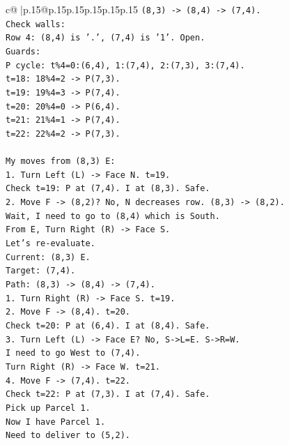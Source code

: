 \documentclass{article}
\begin{document}
{\begin{supertabular}{c@{$\;$}|p{.15\linewidth}@{}p{.15\linewidth}p{.15\linewidth}p{.15\linewidth}p{.15\linewidth}p{.15\linewidth}}
{{{\texttt{(8,3) {-}> (8,4) {-}> (7,4).} \\
\texttt{Check walls:} \\
\texttt{Row 4: (8,4) is '.', (7,4) is '1'. Open.} \\
\texttt{Guards:} \\
\texttt{P cycle: t\%4=0:(6,4), 1:(7,4), 2:(7,3), 3:(7,4).} \\
\texttt{t=18: 18\%4=2 {-}> P(7,3).} \\
\texttt{t=19: 19\%4=3 {-}> P(7,4).} \\
\texttt{t=20: 20\%4=0 {-}> P(6,4).} \\
\texttt{t=21: 21\%4=1 {-}> P(7,4).} \\
\texttt{t=22: 22\%4=2 {-}> P(7,3).} \\
\\ 
\texttt{My moves from (8,3) E:} \\
\texttt{1. Turn Left (L) {-}> Face N. t=19.} \\
\texttt{Check t=19: P at (7,4). I at (8,3). Safe.} \\
\texttt{2. Move F {-}> (8,2)? No, N decreases row. (8,3) {-}> (8,2).} \\
\texttt{Wait, I need to go to (8,4) which is South.} \\
\texttt{From E, Turn Right (R) {-}> Face S.} \\
\texttt{Let's re{-}evaluate.} \\
\texttt{Current: (8,3) E.} \\
\texttt{Target: (7,4).} \\
\texttt{Path: (8,3) {-}> (8,4) {-}> (7,4).} \\
\texttt{1. Turn Right (R) {-}> Face S. t=19.} \\
\texttt{2. Move F {-}> (8,4). t=20.} \\
\texttt{Check t=20: P at (6,4). I at (8,4). Safe.} \\
\texttt{3. Turn Left (L) {-}> Face E? No, S{-}>L=E. S{-}>R=W.} \\
\texttt{I need to go West to (7,4).} \\
\texttt{Turn Right (R) {-}> Face W. t=21.} \\
\texttt{4. Move F {-}> (7,4). t=22.} \\
\texttt{Check t=22: P at (7,3). I at (7,4). Safe.} \\
\texttt{Pick up Parcel 1.} \\
\texttt{Now I have Parcel 1.} \\
\texttt{Need to deliver to (5,2).} \\
}}}
\end{supertabular}}
\end{document}
